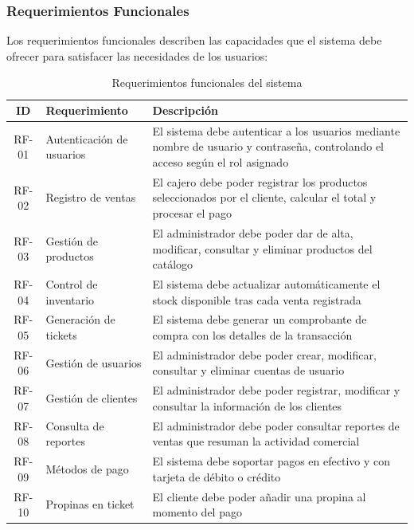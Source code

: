 \documentclass[12pt,a4paper]{report}
\begin{document}
\subsubsection{Requerimientos Funcionales}

Los requerimientos funcionales describen las capacidades que el sistema debe ofrecer para satisfacer las necesidades de los usuarios:

\begin{table}[H]
\centering
\caption{Requerimientos funcionales del sistema}
\label{tab:req_funcionales}
\begin{tabular}{|c|p{4cm}|p{8cm}|}
\hline
\textbf{ID} & \textbf{Requerimiento} & \textbf{Descripción} \\ \hline
RF-01 & Autenticación de usuarios & El sistema debe autenticar a los usuarios mediante nombre de usuario y contraseña, controlando el acceso según el rol asignado \\ \hline
RF-02 & Registro de ventas & El cajero debe poder registrar los productos seleccionados por el cliente, calcular el total y procesar el pago \\ \hline
RF-03 & Gestión de productos & El administrador debe poder dar de alta, modificar, consultar y eliminar productos del catálogo \\ \hline
RF-04 & Control de inventario & El sistema debe actualizar automáticamente el stock disponible tras cada venta registrada \\ \hline
RF-05 & Generación de tickets & El sistema debe generar un comprobante de compra con los detalles de la transacción \\ \hline
RF-06 & Gestión de usuarios & El administrador debe poder crear, modificar, consultar y eliminar cuentas de usuario \\ \hline
RF-07 & Gestión de clientes & El administrador debe poder registrar, modificar y consultar la información de los clientes \\ \hline
RF-08 & Consulta de reportes & El administrador debe poder consultar reportes de ventas que resuman la actividad comercial \\ \hline
RF-09 & Métodos de pago & El sistema debe soportar pagos en efectivo y con tarjeta de débito o crédito \\ \hline
RF-10 & Propinas en ticket & El cliente debe poder añadir una propina al momento del pago \\ \hline
\end{tabular}
\end{table}
\end{document}
